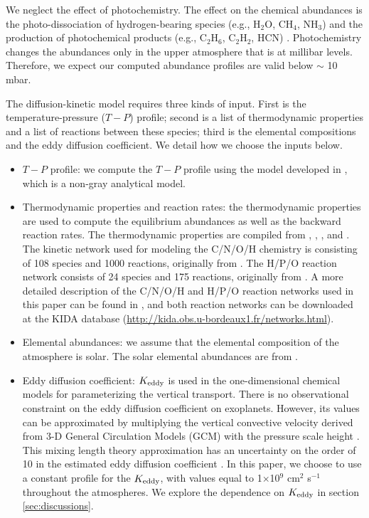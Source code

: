 \documentclass[twocolumn]{aastex61}
\begin{document}
We neglect the effect of photochemistry. The effect on the chemical abundances is the photo-dissociation of hydrogen-bearing species (e.g., H$_2$O, CH$_4$, NH$_3$) and the production of photochemical products (e.g., C$_2$H$_6$, C$_2$H$_2$, HCN) \citep{Moses11,Moses13a,Venot12,Kopparapu12,Agundez14a,MK14}. Photochemistry changes the abundances only in the upper atmosphere that is at millibar levels. Therefore, we expect our computed abundance profiles are valid below $\sim$ 10 mbar. 

The diffusion-kinetic model requires three kinds of input. First is the temperature-pressure ($T-P$) profile; second is a list of thermodynamic properties and a list of reactions between these species; third is the elemental compositions and the eddy diffusion coefficient. We detail how we choose the inputs below. 
\begin{itemize}

\item $T-P$ profile: we compute the $T-P$ profile using the model developed in \citet{Parmentier14,Parmentier15}, which is a non-gray analytical model.   

\item Thermodynamic properties and reaction rates: the thermodynamic properties are used to compute the equilibrium abundances as well as the backward reaction rates. The thermodynamic properties are compiled from \citet{BR05}, \citet{McBride93}, \citet{DB00}, and \citet{Venot12thesis}. The kinetic network used for modeling the C/N/O/H chemistry is consisting of 108 species and 1000 reactions, originally from \citet{Venot12}. The H/P/O reaction network consists of 24 species and 175 reactions, originally from \citet{Twarowski95}. A more detailed description of the C/N/O/H and H/P/O reaction networks used in this paper can be found in \citet{Wang16}, and both reaction networks can be downloaded at the KIDA database (\url{http://kida.obs.u-bordeaux1.fr/networks.html}).  

\item Elemental abundances: we assume that the elemental composition of the atmosphere is solar. The solar elemental abundances are from \citet{Asplund09}. 

\item Eddy diffusion coefficient: $K_{\rm eddy}$ is used in the one-dimensional chemical models for parameterizing the vertical transport. There is no observational constraint on the eddy diffusion coefficient on exoplanets. However, its values can be approximated by multiplying the vertical convective velocity derived from 3-D General Circulation Models (GCM) with the pressure scale height \citep[e.g.,][]{Moses11,Venot12,Parmentier13}. This mixing length theory approximation has an uncertainty on the order of 10 in the estimated eddy diffusion coefficient \citep{Smith98}. In this paper, we choose to use a constant profile for the $K_{\rm eddy}$, with values equal to 1$\times$10$^9$ cm$^2$ s$^{-1}$ throughout the atmospheres. We explore the dependence on $K_{\rm eddy}$ in section \ref{sec:discussions}.
\end{itemize}
\end{document}
